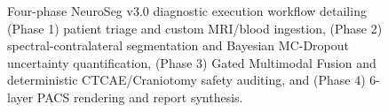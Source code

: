 \documentclass[conference]{IEEEtran}
\begin{document}
\begin{figure}[t]
\caption{Four-phase NeuroSeg v3.0 diagnostic execution workflow detailing (Phase 1) patient triage and custom MRI/blood ingestion, (Phase 2) spectral-contralateral segmentation and Bayesian MC-Dropout uncertainty quantification, (Phase 3) Gated Multimodal Fusion and deterministic CTCAE/Craniotomy safety auditing, and (Phase 4) 6-layer PACS rendering and report synthesis.}
\label{fig:workflow}
\end{figure}
\end{document}
